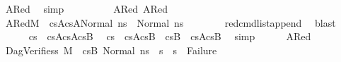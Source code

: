\begin{isabellebody}
\ A{}Red{}\ \isamarkupfalse%
\ simp\isanewline
\ \ \ \isanewline
\ \ \ \ \isamarkupfalse%
\ A{}Red{}\ A{}Red{}\ \isamarkupfalse%
\ A{}Red{}{\isacharcolon}{\kern0pt}{\isachardoublequoteopen}M{\isacharcomma}{\kern0pt}{\isasymLambda}{\isacharcomma}{\kern0pt}{\isasymGamma}{\isacharcomma}{\kern0pt}{\isasymOmega}\ {\isasymturnstile}\ {\isasymlangle}cs{}A{\isacharat}{\kern0pt}cs{}A{\isacharprime}{\kern0pt}{\isacharcomma}{\kern0pt}Normal\ ns{}{\isasymrangle}\ {\isacharbrackleft}{\kern0pt}{\isasymrightarrow}{\isacharbrackright}{\kern0pt}\ Normal\ ns{}{\isacharprime}{\kern0pt}{\isachardoublequoteclose}\isanewline
\ \ \ \ \ \ \isamarkupfalse%
\ red{\isacharunderscore}{\kern0pt}cmd{\isacharunderscore}{\kern0pt}list{\isacharunderscore}{\kern0pt}append\ \isamarkupfalse%
\ blast\isanewline
\ \ \ \ \isamarkupfalse%
\ {\isachardoublequoteopen}cs{}\ {\isacharequal}{\kern0pt}\ {\isacharparenleft}{\kern0pt}cs{}A{\isacharat}{\kern0pt}cs{}A{\isacharprime}{\kern0pt}{\isacharparenright}{\kern0pt}{\isacharat}{\kern0pt}cs{}B{\isacharprime}{\kern0pt}{\isachardoublequoteclose}\ \isamarkupfalse%
\ {\isacartoucheopen}cs{}\ {\isacharequal}{\kern0pt}\ cs{}A{\isacharat}{\kern0pt}cs{}B{\isacartoucheclose}\ \ {\isacartoucheopen}cs{}B\ {\isacharequal}{\kern0pt}\ cs{}A{\isacharprime}{\kern0pt}{\isacharat}{\kern0pt}cs{}B{\isacharprime}{\kern0pt}{\isacartoucheclose}\ \isamarkupfalse%
\ simp\isanewline
\ \ \ \ \isamarkupfalse%
\ A{}Red{}\ \isamarkupfalse%
\ DagVerifies{}{\isacharcolon}{\kern0pt}{\isachardoublequoteopen}{\isasymAnd}s{}{\isacharprime}{\kern0pt}{\isachardot}{\kern0pt}\ M{\isacharcomma}{\kern0pt}{\isasymLambda}{\isacharcomma}{\kern0pt}{\isasymGamma}{\isacharcomma}{\kern0pt}{\isasymOmega}\ {\isasymturnstile}\ {\isasymlangle}cs{}B{\isacharprime}{\kern0pt}{\isacharcomma}{\kern0pt}\ Normal\ ns{}{\isacharprime}{\kern0pt}{\isasymrangle}\ {\isacharbrackleft}{\kern0pt}{\isasymrightarrow}{\isacharbrackright}{\kern0pt}\ s{}{\isacharprime}{\kern0pt}\ {\isasymLongrightarrow}\ s{}{\isacharprime}{\kern0pt}\ {\isasymnoteq}\ Failure{\isachardoublequoteclose}\isanewline

\end{isabellebody}
